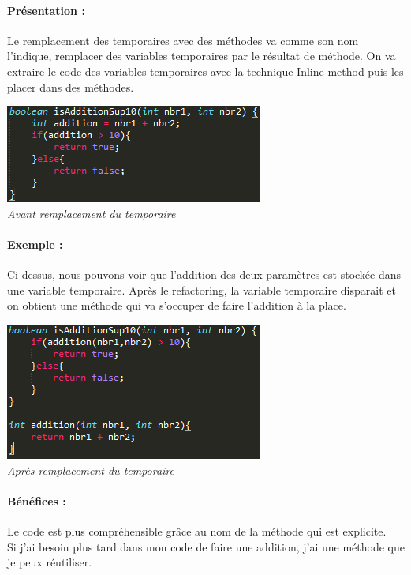 \documentclass[a4paper,twoside,12pt,openright]{report}
\begin{document}
\paragraph{Présentation :}
Le remplacement des temporaires avec des méthodes va comme son nom l'indique, remplacer des variables temporaires par le résultat de méthode. On va extraire le code des variables temporaires avec la technique Inline method puis les placer dans des méthodes.

\begin{center}
\includegraphics[scale=1]{Image/Remplacement_Temp_Methode.png}\\
\itshape{Avant remplacement du temporaire}
\end{center}

\paragraph{Exemple :}
Ci-dessus, nous pouvons voir que l'addition des deux paramètres est stockée dans une variable temporaire. Après le refactoring, la variable temporaire disparait et on obtient une méthode qui va s'occuper de faire l'addition à la place.

\begin{center}
\includegraphics[scale=1]{Image/Remplacement_Temp_Methode2.png}\\
\itshape{Après remplacement du temporaire}
\end{center}

\paragraph{Bénéfices :}
Le code est plus compréhensible grâce au nom de la méthode qui est explicite.\\
Si j'ai besoin plus tard dans mon code de faire une addition, j'ai une méthode que je peux réutiliser.\\
\end{document}

